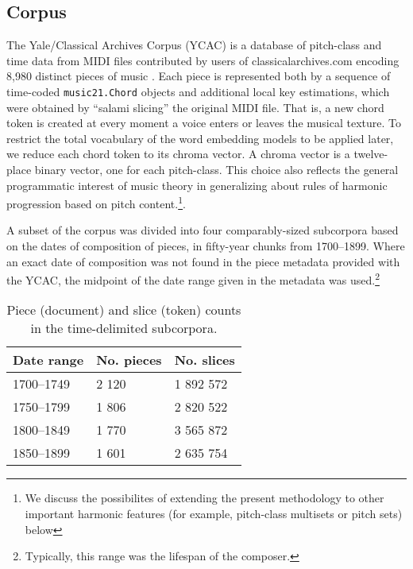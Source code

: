 \subsection{Corpus}\label{corpus}

The Yale/Classical Archives Corpus (YCAC) is a database of pitch-class
and time data from MIDI files contributed by users of
classicalarchives.com encoding 8,980 distinct pieces of music
\cite{white2014yale}. Each piece is represented both by a sequence of
time-coded \texttt{music21.Chord} objects and additional local key estimations, which were obtained by ``salami slicing'' the original MIDI file. That is, a new chord token is created at every moment a voice enters or leaves the musical texture. To restrict the total vocabulary of the word embedding models to be applied later, we reduce each chord token to its chroma vector. A chroma vector is a twelve-place binary vector, one for each pitch-class. This choice also reflects the general programmatic interest of music theory in generalizing about rules of harmonic progression based on pitch content.\footnote{We discuss the possibilites of extending the present methodology to other important harmonic features (for example, pitch-class multisets or pitch sets) below}. 

A subset of the corpus was divided into four comparably-sized subcorpora based on the dates of composition of pieces, in fifty-year chunks from 1700--1899. Where an exact date of composition was not found in the piece metadata provided with the YCAC, the midpoint of the date range given in the metadata was used.\footnote{Typically, this range was the lifespan of the composer.}

\begin{table}
 \begin{center}
 \begin{tabular}{|l|l|l|}
  \hline
  Date range & No. pieces  & No. slices  \\
\hline
\hline
1700--1749 & 2 120 & 1 892 572 \\
\hline
1750--1799 & 1 806 & 2 820 522 \\
\hline
1800--1849 & 1 770 & 3 565 872 \\
\hline
1850--1899 & 1 601 & 2 635 754 \\
\hline

 \end{tabular}
\end{center}
 \caption{Piece (document) and slice (token) counts in the time-delimited subcorpora.}
 \label{tab:counts}
\end{table}

